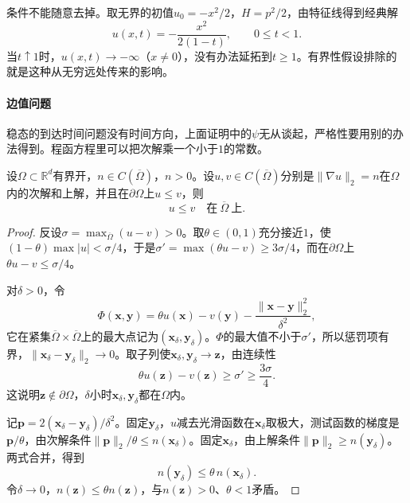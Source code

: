 条件不能随意去掉。取无界的初值$u_0=-x^2/2$，$H=p^2/2$，由特征线得到经典解
\[
  u(x,t)=-\frac{x^2}{2(1-t)},\qquad0\leq t<1.
\]
当$t\uparrow1$时，$u(x,t)\to-\infty$（$x\neq0$），没有办法延拓到$t\geq1$。有界性假设排除的就是这种从无穷远处传来的影响。

\paragraph{边值问题}
稳态的到达时间问题没有时间方向，上面证明中的$\psi$无从谈起，严格性要用别的办法得到。程函方程里可以把次解乘一个小于$1$的常数。

\begin{theorem}[程函方程的比较原理]
\label{thm:hj-comparison-eikonal}
设$\Omega\subset\mathbb{R}^{d}$有界开，$n\in C(\overline{\Omega})$，$n>0$。设$u,v\in C(\overline{\Omega})$分别是$\lVert\nabla u\rVert_2=n$在$\Omega$内的次解和上解，并且在$\partial\Omega$上$u\leq v$，则
\begin{equation}
  u\leq v\quad\text{在}\ \overline{\Omega}\ \text{上}.
  \label{eq:hj-comparison-eikonal}
\end{equation}
\end{theorem}

\begin{proof}
反设$\sigma=\max_{\overline{\Omega}}(u-v)>0$。取$\theta\in(0,1)$充分接近$1$，使$(1-\theta)\max\lvert u\rvert<\sigma/4$，于是$\sigma'=\max(\theta u-v)\geq3\sigma/4$，而在$\partial\Omega$上$\theta u-v\leq\sigma/4$。

对$\delta>0$，令
\[
  \Phi(\bm{x},\bm{y})=\theta u(\bm{x})-v(\bm{y})-\frac{\lVert\bm{x}-\bm{y}\rVert_2^2}{\delta^2},
\]
它在紧集$\overline{\Omega}\times\overline{\Omega}$上的最大点记为$(\bm{x}_\delta,\bm{y}_\delta)$。$\Phi$的最大值不小于$\sigma'$，所以惩罚项有界，$\lVert\bm{x}_\delta-\bm{y}_\delta\rVert_2\to0$。取子列使$\bm{x}_\delta,\bm{y}_\delta\to\bm{z}$，由连续性
\[
  \theta u(\bm{z})-v(\bm{z})\geq\sigma'\geq\frac{3\sigma}{4}.
\]
这说明$\bm{z}\notin\partial\Omega$，$\delta$小时$\bm{x}_\delta,\bm{y}_\delta$都在$\Omega$内。

记$\bm{p}=2(\bm{x}_\delta-\bm{y}_\delta)/\delta^2$。固定$\bm{y}_\delta$，$u$减去光滑函数在$\bm{x}_\delta$取极大，测试函数的梯度是$\bm{p}/\theta$，由次解条件$\lVert\bm{p}\rVert_2/\theta\leq n(\bm{x}_\delta)$。固定$\bm{x}_\delta$，由上解条件$\lVert\bm{p}\rVert_2\geq n(\bm{y}_\delta)$。两式合并，得到
\[
  n(\bm{y}_\delta)\leq\theta\,n(\bm{x}_\delta).
\]
令$\delta\to0$，$n(\bm{z})\leq\theta n(\bm{z})$，与$n(\bm{z})>0$、$\theta<1$矛盾。
\end{proof}

